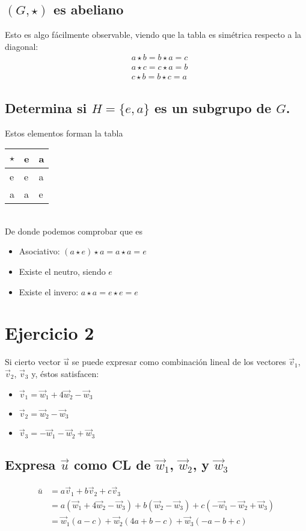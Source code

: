 \documentclass{article}
\begin{document}
\subsection{$(G,\star)$ es abeliano}
Esto es algo fácilmente observable, viendo que la tabla es simétrica respecto a la diagonal:
\begin{align}
    &a\star b = b\star a = c\\
    &a \star c = c\star a = b\\
    &c \star b = b \star c = a
\end{align}
\pagebreak
\subsection{Determina si $H=\{ e,a \}$ es un subgrupo de $G$.}
Estos elementos forman la tabla
\begin{table}[h!]
    \centering
    \begin{tabular}{l|ll}
    $\star$ & e & a \\ \hline
    e                    & e & a \\
    a                    & a & e
    \end{tabular}
\end{table}\\
De donde podemos comprobar que es
\begin{itemize}
    \item Asociativo: $(a\star e) \star a = a\star a = e$
    \item Existe el neutro, siendo $e$
    \item Existe el invero: $a\star a = e\star e = e$
\end{itemize}
\pagebreak
\section{Ejercicio 2}
Si cierto vector $\vec{u}$ se puede expresar como combinación lineal de los vectores $\vec{v}_{1}$,
$\vec{v}_{2}$, $\vec{v}_{3}$ y, éstos satisfacen:
\begin{itemize}
    \item $\vec{v}_{1} = \vec{w}_{1}+4 \vec{w}_{2}- \vec{w}_{3}$
    \item $\vec{v}_{2} = \vec{w}_{2} - \vec{w}_{3}$
    \item $\vec{v}_{3} = -\vec{w}_{1} - \vec{w}_{2} + \vec{w}_{3}$
\end{itemize}
\subsection{Expresa $\vec{u}$ como CL de $\vec{w}_{1}$, $\vec{w}_{2}$, y $\vec{w}_{3}$}
\begin{equation}
    \begin{split}
        \bar{u} &= a \vec{v}_{1} + b \vec{v}_{2} + c \vec{v}_{3}\\ &= a(\vec{w}_{1}+4 \vec{w}_{2}- \vec{w}_{3})
        + b(\vec{w}_{2} - \vec{w}_{3}) + c(-\vec{w}_{1} - \vec{w}_{2} + \vec{w}_{3})\\
        &= \vec{w}_{1}(a-c) +\vec{w}_{2}(4a+b-c) +\vec{w}_{3} (-a-b+c)
    \end{split}
\end{equation}
\end{document}
